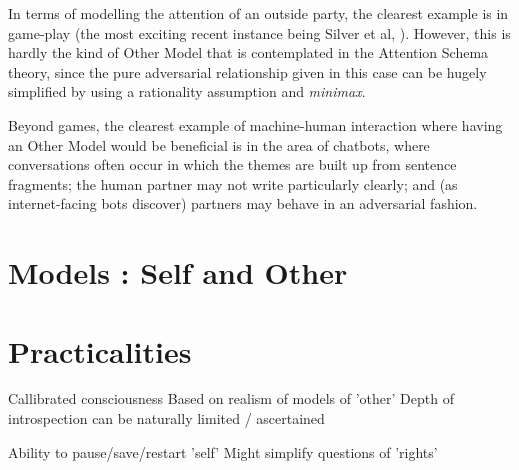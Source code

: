 \documentclass[citeauthoryear]{llncs}
\begin{document}


In terms of modelling the attention of an outside party, the clearest 
example is in game-play (the most exciting recent instance being Silver et al, \cite{AlphaGo}).
%
However, this is hardly the kind of Other Model that is contemplated in
the Attention Schema theory, since the pure adversarial relationship given in 
this case can be hugely simplified by using a rationality assumption and \emph{minimax}.








Beyond games, the clearest example of machine-human interaction where having an Other Model
would be beneficial is in the area of chatbots, where conversations often occur in which the 
themes are built up from sentence fragments; the human partner may not
write particularly clearly; and (as internet-facing bots discover) partners
may behave in an adversarial fashion.


\section{Models : Self and Other}



\section{Practicalities}



Callibrated consciousness
  Based on realism of models of 'other'
  Depth of introspection can be naturally limited / ascertained
  
  Ability to pause/save/restart 'self'
  Might simplify questions of 'rights'
\end{document}
